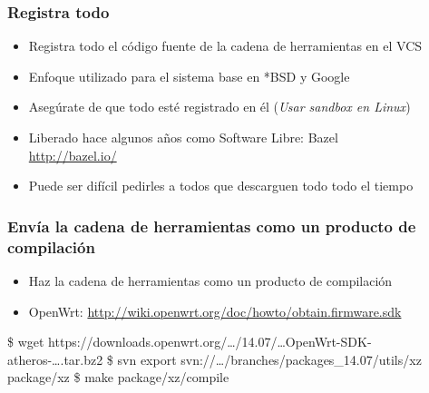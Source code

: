 \documentclass[14pt,aspectratio=169]{beamer}
\begin{document}
\begin{frame}
 \frametitle{Registra todo}

 \begin{itemize}
  \item Registra todo el código fuente de la cadena de herramientas en el VCS
  \item Enfoque utilizado para el sistema base en *BSD y Google
  \item Asegúrate de que todo esté registrado en él (\textit{Usar sandbox en Linux})
  \item Liberado hace algunos años como Software Libre: Bazel \\
   \url{http://bazel.io/}
  \item Puede ser difícil pedirles a todos que descarguen todo todo el tiempo
 \end{itemize}
\end{frame}

\begin{frame}[fragile]
 \frametitle{Envía la cadena de herramientas como un producto de compilación}

 \begin{itemize}
  \item Haz la cadena de herramientas como un producto de compilación
  \item OpenWrt:
    \url{http://wiki.openwrt.org/doc/howto/obtain.firmware.sdk}
 \end{itemize}

 \begin{example}\footnotesize
\begin{semiverbatim}
\$ wget https://downloads.openwrt.org/…/14.07/…OpenWrt-SDK-atheros-….tar.bz2
\$ svn export svn://…/branches/packages\_14.07/utils/xz package/xz
\$ make package/xz/compile
\end{semiverbatim}
 \end{example}

\end{frame}
\end{document}
